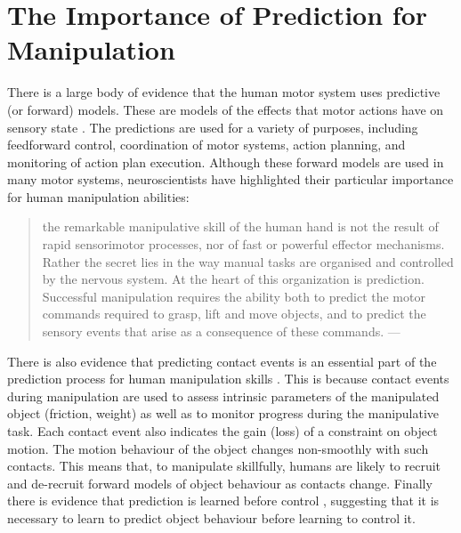 \section{The Importance of Prediction for Manipulation}
\label{sec:motivation}
There is a large body of evidence that the human motor system uses predictive (or forward) models. These are models of the effects that motor actions have on sensory state \citep{flanagan03,flanagan06,mehta02,witney00,johansson92}. The predictions are used for a variety of purposes, including feedforward control, coordination of motor systems, action planning, and monitoring of action plan execution. Although these forward models are used in many motor systems, neuroscientists have highlighted their particular importance for human manipulation abilities:

\begin{quotation} the remarkable manipulative skill of the human hand is not the result of rapid sensorimotor processes, nor of fast or powerful effector mechanisms. Rather the secret lies in the way manual tasks are  organised and controlled by the nervous system. At the heart of this organization is prediction. Successful manipulation requires the ability both to predict the motor commands required to grasp, lift and move objects, and to predict the sensory events that arise as a consequence of these commands. --- \citep{flanagan06}
\end{quotation}

There is also evidence that predicting contact events is an essential part of the prediction process for human manipulation skills \citep{flanagan06}. This is because contact events during manipulation are used to assess intrinsic parameters of the manipulated object (friction, weight) as well as to monitor progress during the manipulative task. Each contact event also indicates the gain (loss) of a constraint on object motion. The motion behaviour of the object changes non-smoothly with such contacts. This means that, to manipulate skillfully, humans are likely to recruit and de-recruit forward models of object behaviour as contacts change.  Finally there is evidence that prediction is learned before control \citep{flanagan03}, suggesting that it is necessary to learn to predict object behaviour before learning to control it.

